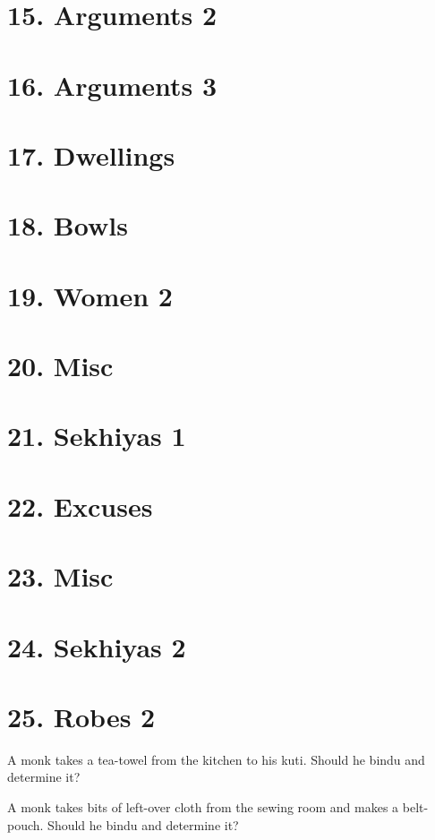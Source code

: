 \section{15. Arguments 2}

\section{16. Arguments 3}

\section{17. Dwellings}

\section{18. Bowls}

\section{19. Women 2}

\section{20. Misc}

\section{21. Sekhiyas 1}

\section{22. Excuses}

\section{23. Misc}

\section{24. Sekhiyas 2}

\section{25. Robes 2}

A monk takes a tea-towel from the kitchen to his kuti. Should he bindu
and determine it?

A monk takes bits of left-over cloth from the sewing room and makes a
belt-pouch. Should he bindu and determine it?

